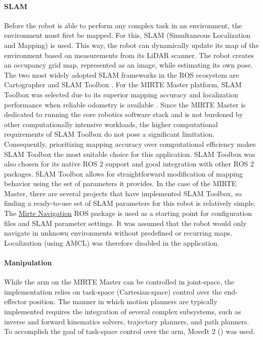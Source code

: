     \paragraph{SLAM}
    Before the robot is able to perform any complex task in an environment, the environment must first be mapped. For this, SLAM (Simultaneous Localization and Mapping) is used. This way, the robot can dynamically update its map of the environment based on measurements from its LiDAR scanner.
    The robot creates an occupancy grid map, represented as an image, while estimating its own pose.
    The two most widely adopted SLAM frameworks in the ROS ecosystem are Cartographer \cite{cartographer} and SLAM Toolbox \cite{SlamTBX2021}. For the MIRTE Master platform, SLAM Toolbox was selected due to its superior mapping accuracy and localization performance when reliable odometry is available \cite{slamvscart}. Since the MIRTE Master is dedicated to running the core robotics software stack and is not burdened by other computationally intensive workloads, the higher computational requirements of SLAM Toolbox do not pose a significant limitation. Consequently, prioritizing mapping accuracy over computational efficiency makes SLAM Toolbox the most suitable choice for this application.
    SLAM Toolbox was also chosen for its native ROS 2 support and good integration with other ROS 2 packages. SLAM Toolbox allows for straightforward modification of mapping behavior using the set of parameters it provides. In the case of the MIRTE Master, there are several projects that have implemented SLAM Toolbox, so finding a ready-to-use set of SLAM parameters for this robot is relatively simple. The \href{https://github.com/MartijnWisse/mirte\_navigation}{Mirte Navigation} ROS package is used as a starting point for configuration files and SLAM parameter settings.
    It was assumed that the robot would only navigate in unknown environments without predefined or recurring maps. Localization (using AMCL) was therefore disabled in the application.
    \paragraph{Manipulation}

    While the arm on the MIRTE Master can be controlled in joint-space, the implementation relies on task-space (Cartesian-space) control over the end-effector position. \newline
    The manner in which motion planners are typically implemented requires the integration of several complex subsystems, such as inverse and forward kinematics solvers, trajectory planners, and path planners. To accomplish the goal of task-space control over the arm, MoveIt 2 (\cite{Coleman2014MoveIt}) was used.
    

